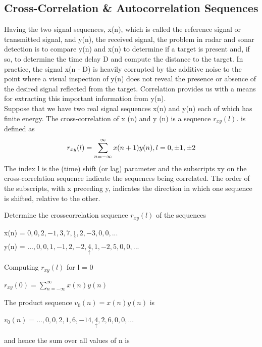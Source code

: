 \documentclass{article}
\begin{document}
\subsection{Cross-Correlation \& Autocorrelation Sequences}
Having the two signal sequences, x(n), which is called the reference signal or
transmitted signal, and y(n), the received signal, the problem in radar and sonar
detection is to compare y(n) and x(n) to determine if a target is present and, if so,
to determine the time delay D and compute the distance to the target. In practice,
the signal x(n - D) is heavily corrupted by the additive noise to the point where
a visual inspection of y(n) does not reveal the presence or absence of the desired
signal reflected from the target. Correlation provides us with a means for extracting
this important information from y(n). \\
\vspace{1em}
Suppose that we have two real signal sequences x(n) and y(n) each of which has
finite energy. The cross-correlation of x (n) and y (n) is a sequence $r_{xy}(l)$. is defined as
\begin{equation}
r_{xy}(l) = \sum_{n=-\infty}^{\infty}x(n+1)y(n), \space l = 0 ,\pm 1, \pm 2
\end{equation}
The index l is the (time) shift (or lag) parameter and the subscripts xy on the cross-correlation sequence  indicate the sequences being correlated. The order of
the subscripts, with x preceding y, indicates the direction in which one sequence
is shifted, relative to the other.
\begin{center}
Determine the crosscorrelation sequence $r_{xy} (l)$ of the sequences   \\
\vspace{1em}

x(n) = ${0, 0, 2, -1, 3, 7, \underset{\uparrow}{1}, 2, -3, 0, 0,...}$ \\
\vspace{1em}
y(n) = ${..., 0, 0, 1, -1, 2, -2, \underset{\uparrow}{4}, 1, -2, 5, 0, 0,...}$
\end{center}
Computing $r_{xy}(l)$ for l = 0
\begin{center}
    $r_{xy}(0) = \sum_{n=-\infty}^{\infty}x(n)y(n)$
\end{center}
The product sequence $v_0(n) = x(n)y(n)$ is
\begin{center}
    $v_0(n) = {..., 0, 0, 2, 1, 6, -14, \underset{\uparrow}{4}, 2, 6, 0, 0,...}$
\end{center}
and hence the sum over all values of n is
\end{document}
